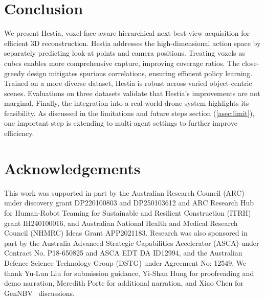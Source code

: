 \section{Conclusion}

We present Hestia, voxel-face-aware hierarchical next-best-view acquisition for efficient 3D reconstruction. 
Hestia addresses the high-dimensional action space by separately predicting look-at points and camera positions.
Treating voxels as cubes enables more comprehensive capture, improving coverage ratios. 
The close-greedy design mitigates spurious correlations, ensuring efficient policy learning. 
Trained on a more diverse dataset, Hestia is robust across varied object-centric scenes.
Evaluations on three datasets validate that Hestia’s improvements are not marginal. 
Finally, the integration into a real-world drone system highlights its feasibility. 
As discussed in the limitations and future steps section (\cref{asec:limit}), one important step is extending to multi-agent settings to further improve efficiency.

\section{Acknowledgements}

This work was supported in part by the Australian Research Council (ARC) under discovery grant DP220100803 and DP250103612 and ARC Research Hub for Human-Robot Teaming for Sustainable and Resilient Construction (ITRH) grant IH240100016, and Australian National Health and Medical Research Council (NHMRC) Ideas Grant APP2021183. Research was also sponsored in part by the Australia Advanced Strategic Capabilities Accelerator (ASCA) under Contract No. P18-650825 and ASCA EDT DA ID12994, and the Australian Defence Science Technology Group (DSTG) under Agreement No: 12549.
We thank Yu-Lun Liu for submission guidance, Yi-Shan Hung for proofreading and demo narration, Meredith Porte for additional narration, and Xiao Chen for GenNBV~\cite{chen2024gennbv} discussions.
